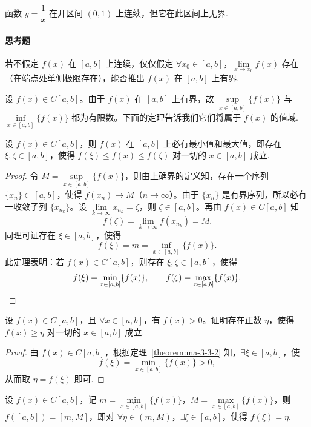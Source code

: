 \begin{example}\label{example:ma-3-3-1}
函数 $y=\dfrac1x$ 在开区间 $(0,1)$ 上连续，但它在此区间上无界.
\end{example}


\paragraph*{思考题}
若不假定 $f(x)$ 在 $[a,b]$ 上连续，仅仅假定 $\forall x_0\in[a,b]$，$\lim\limits_{x\to x_0}f(x)$ 存在（在端点处单侧极限存在），能否推出 $f(x)$ 在 $[a,b]$ 上有界.

设 $f(x)\in C[a,b]$。由于 $f(x)$ 在 $[a,b]$ 上有界，故 $\sup\limits_{x\in[a,b]}\{f(x)\}$ 与 $\inf\limits_{x\in[a,b]}\{f(x)\}$ 都为有限数。下面的定理告诉我们它们将属于 $f(x)$ 的值域.

\begin{theorem}[{最值定理}]\label{theorem:ma-3-3-2}
设 $f(x)\in C[a,b]$，则 $f(x)$ 在 $[a,b]$ 上必有最小值和最大值，即存在 $\xi,\zeta\in[a,b]$，使得 $f(\xi)\leqslant f(x)\leqslant f(\zeta)$ 对一切的 $x\in[a,b]$ 成立.
\end{theorem}


\begin{proof}
令 $M=\sup\limits_{x\in[a,b]}\{f(x)\}$，则由上确界的定义知，存在一个序列 $\{x_n\}\subset[a,b]$，使得 $f(x_n)\to M$（$n\to\infty$）。由于 $\{x_n\}$ 是有界序列，所以必有一收敛子列 $\{x_{n_k}\}$。设 $\lim\limits_{k\to\infty}x_{n_k}=\zeta$，则 $\zeta\in[a,b]$。再由 $f(x)\in C[a,b]$ 知
\[
  f(\zeta)=\lim_{k\to\infty}f(x_{n_k})=M.
\]
同理可证存在 $\xi\in[a,b]$，使得
\[
  f(\xi)=m=\inf_{x\in[a,b]}\{f(x)\}.
\]
此定理表明：若 $f(x)\in C[a,b]$，则存在 $\xi,\zeta\in[a,b]$，使得
\[
  f(\xi)=\min_{x\in[a,b]}\{f(x)\},\qquad
  f(\zeta)=\max_{x\in[a,b]}\{f(x)\}.
\qedhere
\]
\end{proof}


\begin{example}\label{example:ma-3-3-2}
设 $f(x)\in C[a,b]$，且 $\forall x\in[a,b]$，有 $f(x)>0$。证明存在正数 $\eta$，使得 $f(x)\geqslant\eta$ 对一切的 $x\in[a,b]$ 成立.
\end{example}


\begin{proof}
由 $f(x)\in C[a,b]$，根据定理~\ref{theorem:ma-3-3-2} 知，$\exists\xi\in[a,b]$，使
\[
  f(\xi)=\min_{x\in[a,b]}\{f(x)\}>0,
\]
从而取 $\eta=f(\xi)$ 即可.
\end{proof}


\begin{theorem}[{介值定理}]\label{theorem:ma-3-3-3}
设 $f(x)\in C[a,b]$，记 $m=\min\limits_{x\in[a,b]}\{f(x)\}$，$M=\max\limits_{x\in[a,b]}\{f(x)\}$，则 $f([a,b])=[m,M]$，即对 $\forall\eta\in(m,M)$，$\exists\xi\in[a,b]$，使得 $f(\xi)=\eta$.
\end{theorem}


